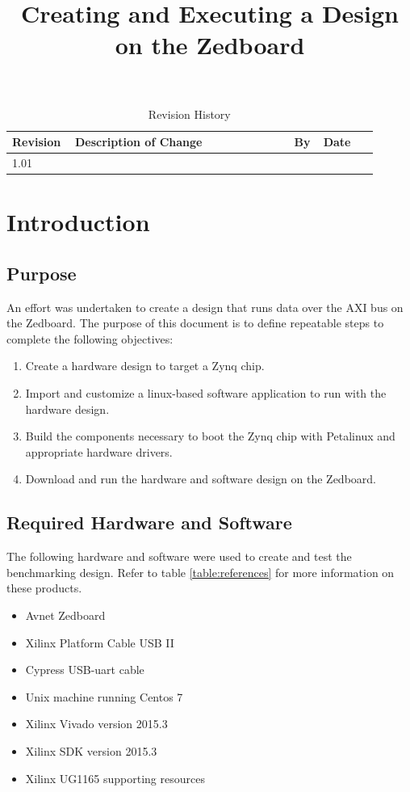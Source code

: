 \documentclass[12pt]{article}
\title{Creating and Executing a Design on the Zedboard}
\begin{document}
\maketitle
\newpage
\begin{table}[h!] 
  \caption{Revision History}
  \begin{tabular}{|p{0.12\linewidth}|p{0.57\linewidth}|p{0.07\linewidth}|p{0.14\linewidth}|}
    \hline
    \textbf{Revision} & \textbf{Description of Change} & \textbf{By} & \textbf{Date}\\ \hline
    1.01 &   &   &  \\ \hline
  \end{tabular}
\end{table}
\newpage
\tableofcontents
\newpage
{}

\section{Introduction}

\subsection{Purpose}
An effort was undertaken to create a design that runs data over the AXI bus on the Zedboard.  The purpose of this document is to define repeatable steps to complete the following objectives:

\begin{enumerate}

\item Create a hardware design to target a Zynq chip.
\item Import and customize a linux-based software application to run with the hardware design.
\item Build the components necessary to boot the Zynq chip with Petalinux and appropriate hardware drivers.
\item Download and run the hardware and software design on the Zedboard.
\end{enumerate}

\subsection{Required Hardware and Software}
The following hardware and software were used to create and test the benchmarking design.  Refer to table \ref{table:references} for more information on these products.
\begin{itemize}
\item Avnet Zedboard
\item Xilinx Platform Cable USB II
\item Cypress USB-uart cable 
\item Unix machine running Centos 7 
\item Xilinx Vivado version 2015.3
\item Xilinx SDK version 2015.3
\item Xilinx UG1165 supporting resources
\end{itemize}
\end{document}
